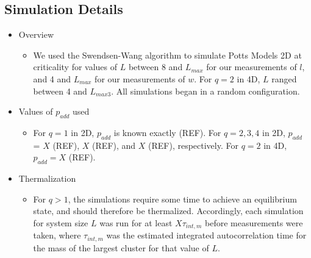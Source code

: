\documentclass{umthesis}          %
\begin{document}
\subsection{Simulation Details}
\label{sec-4.2.5}

\begin{itemize}

\item Overview\\
\label{sec-4.2.5.1}

\begin{itemize}

\item We used the Swendsen-Wang algorithm to simulate Potts Models 2D at criticality for values of $L$ between 8 and $L_{max}$ for our  measurements of $l$, and 4 and $L_{max}$ for our measurements of $w$.  For $q=2$ in 4D, $L$ ranged between 4 and $L_{max3}$.  All simulations began in a random configuration.\\
\label{sec-4.2.5.1.1}

\end{itemize} %

\item Values of $p_{add}$ used\\
\label{sec-4.2.5.2}

\begin{itemize}

\item For $q=1$ in 2D, $p_{add}$ is known exactly (REF).  For $q=2,3,4$ in 2D, $p_{add}$ = $X$ (REF), $X$ (REF), and $X$ (REF), respectively. For $q=2$ in 4D, $p_{add}=X$ (REF).\\
\label{sec-4.2.5.2.1}

\end{itemize} %

\item Thermalization\\
\label{sec-4.2.5.3}

\begin{itemize}

\item For $q>1$, the simulations require some time to achieve an equilibrium state, and should therefore be thermalized. Accordingly, each simulation for system size $L$ was run for at least $X \tau_{int,m}$ before measurements were taken, where $\tau_{int,m}$ was the estimated integrated autocorrelation time for the mass of the largest cluster for that value of $L$.\\
\label{sec-4.2.5.3.1}



\end{itemize}
\end{itemize}
\end{document}
